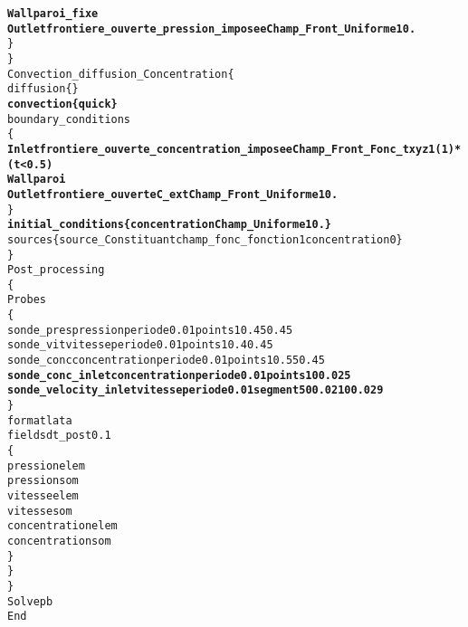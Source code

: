 \begin{alltt}
            {\bf{Wall    paroi_fixe}}
            {\bf{Outlet  frontiere_ouverte_pression_imposee Champ_Front_Uniforme 1 0.}}
        \}
    \}
    Convection_diffusion_Concentration \{
        diffusion \{ \}
        {\bf{convection \{ quick \} }}
        boundary_conditions 
        \{
            {\bf{Inlet   frontiere_ouverte_concentration_imposee Champ_Front_Fonc_txyz 1 (1)*(t<0.5)}}
            {\bf{Wall    paroi}}
            {\bf{Outlet  frontiere_ouverte C_ext Champ_Front_Uniforme 1 0.}}
        \}
        {\bf{initial_conditions \{ concentration Champ_Uniforme 1 0. \} }}
        sources \{ source_Constituant champ_fonc_fonction 1 concentration 0 \}
    \}
    Post_processing
    \{
        Probes
        \{
            sonde_pres pression periode 0.01 points 1 0.45 0.45
            sonde_vit vitesse periode 0.01 points 1 0.4 0.45
            sonde_conc concentration periode 0.01 points 1 0.55 0.45
            {\bf{sonde_conc_inlet concentration periode 0.01 points 1 0 0.025 }}
            {\bf{sonde_velocity_inlet vitesse periode 0.01 segment 5 0 0.021 0 0.029}}
        \}
        format lata
        fields dt_post 0.1
        \{
            pression elem
            pression som
            vitesse elem
            vitesse som
            concentration elem
            concentration som
        \}
    \}
\}
Solve pb
End
\end{alltt}
